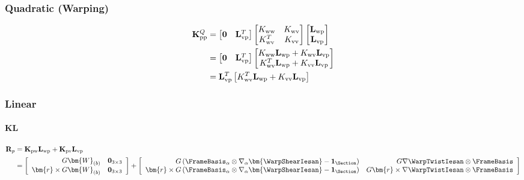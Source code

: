\subsubsection{Quadratic (Warping)}
\[
\begin{aligned}
\mathbf{K}^Q_{\rm pp}
&= \begin{bmatrix}
    \mathbf{0} & \mathbf{L}_{\rm vp}^T
\end{bmatrix}
\begin{bmatrix}
    K_{\rm ww} & K_{\rm wv} \\
    K_{\rm wv}^T & K_{\rm vv}
\end{bmatrix}
\begin{bmatrix}
    \mathbf{L}_{\rm wp} \\ \mathbf{L}_{\rm vp}
\end{bmatrix} \\
&= \begin{bmatrix}
    \mathbf{0} & \mathbf{L}_{\rm vp}^T
\end{bmatrix}
\begin{bmatrix}
    K_{\rm ww}\mathbf{L}_{\rm wp}+ K_{\rm wv}\mathbf{L}_{\rm vp} \\
    K_{\rm wv}^T \mathbf{L}_{\rm wp} + K_{\rm vv}\mathbf{L}_{\rm vp}
\end{bmatrix} \\
&= \mathbf{L}_{\rm vp}^T \left[
K_{\rm wv}^T \mathbf{L}_{\rm wp} + K_{\rm vv}\mathbf{L}_{\rm vp}
\right]
\end{aligned}
\]

\subsubsection{Linear}
\paragraph{KL}

$$
\begin{aligned}
\mathbf{R}_p & =\mathbf{K}_{\rm p w} \mathbf{L}_{\rm w p}+\mathbf{K}_{\rm p v} \mathbf{L}_{\rm v p} \\
& =\left[\begin{array}{rr}
G \bm{W}_{(b)} & \mathbf{0}_{3\times3} \\ 
\bm{r} \times G \bm{W}_{(b)} & \mathbf{0}_{3\times3}
\end{array}\right]
+\left[\begin{array}{rr}
G\left(\FrameBasis_\alpha \otimes \nabla_\alpha \bm{\WarpShearIesan}-\mathbf{1}_{\Section}\right) & G \nabla \WarpTwistIesan\otimes\FrameBasis \\
\bm{r} \times G\left( \FrameBasis_\alpha \otimes \nabla_\alpha \bm{\WarpShearIesan} - \mathbf{1}_{\Section}\right) & G \bm{r} \times \nabla \WarpTwistIesan\otimes\FrameBasis
\end{array}\right]
\end{aligned}
$$


